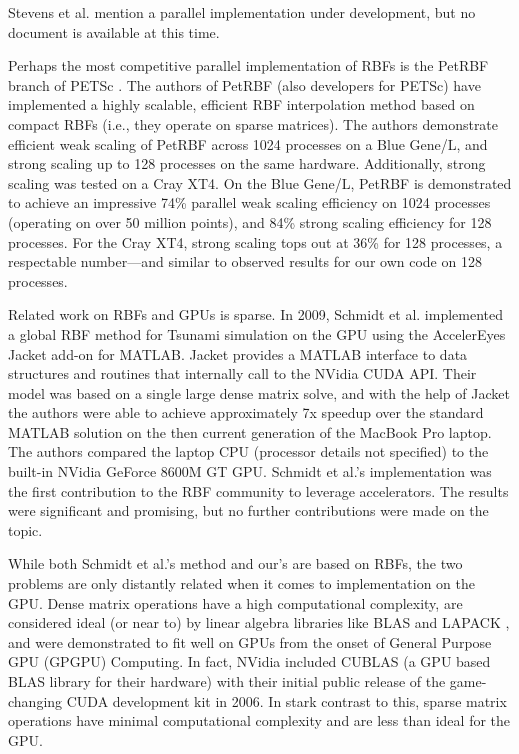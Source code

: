 \documentclass{report}
\begin{document}
Stevens et al. \cite{Stevens2009a} mention a parallel implementation under development, but no document is available at this time. 

Perhaps the most competitive parallel implementation of RBFs is the PetRBF \cite{Yokota2010} branch of PETSc \cite{PETSc}. The authors of PetRBF (also developers for PETSc) have implemented a highly scalable, efficient RBF interpolation method based on compact RBFs (i.e., they operate on sparse matrices). The authors demonstrate efficient weak scaling of PetRBF across 1024 processes on a Blue Gene/L, and strong scaling up to 128 processes on the same hardware. Additionally, strong scaling was tested on a Cray XT4. On the Blue Gene/L, PetRBF is demonstrated to achieve an impressive 74\% parallel weak scaling efficiency on 1024 processes (operating on over 50 million points), and 84\% strong scaling efficiency for 128 processes. For the Cray XT4, strong scaling tops out at 36\% for 128 processes, a respectable number---and similar to observed results for our own code on 128 processes.  


Related work on RBFs and GPUs is sparse. In 2009, Schmidt et al. \cite{Schmidt2009a, Schmidt2009b} implemented a global RBF method for Tsunami simulation on the GPU using the AccelerEyes Jacket \cite{JacketGuide2009} add-on for MATLAB. Jacket provides a MATLAB interface to data structures and routines that internally call to the NVidia CUDA API. Their model was based on a single large dense matrix solve, and with the help of Jacket the authors were able to achieve approximately 7x speedup over the standard MATLAB solution on the then current generation of the MacBook Pro laptop. The authors compared the laptop CPU (processor details not specified) to the built-in NVidia GeForce 8600M GT GPU. Schmidt et al.'s implementation was the first contribution to the RBF community to leverage accelerators. The results were significant and promising, but no further contributions were made on the topic. 

While both Schmidt et al.'s method and our's are based on RBFs, the two problems are only distantly related when it comes to implementation on the GPU. Dense matrix operations have a high computational complexity, are considered ideal (or near to) by linear algebra libraries like BLAS \cite{BLAS} and LAPACK \cite{Lapack1999}, and were demonstrated to fit well on GPUs from the onset of General Purpose GPU (GPGPU) Computing. In fact, NVidia included CUBLAS \cite{CUBLAS} (a GPU based BLAS library for their hardware) with their initial public release of the game-changing CUDA development kit in 2006. In stark contrast to this, sparse matrix operations have minimal computational complexity and are less than ideal for the GPU.
\end{document}
